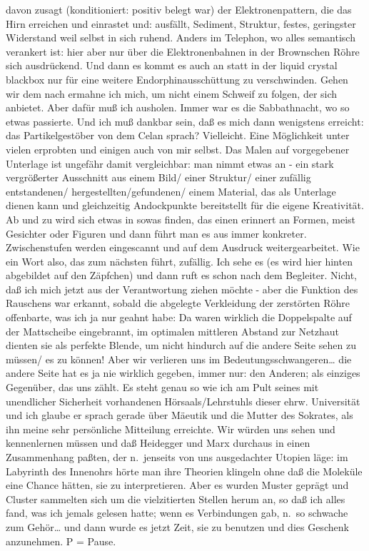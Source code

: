 \documentclass[
]{article}
\begin{document}
davon zusagt (konditioniert: positiv belegt war) der Elektronenpattern,
die das Hirn erreichen und einrastet und: ausfällt, Sediment, Struktur,
festes, geringster Widerstand weil selbst in sich ruhend. Anders im
Telephon, wo alles semantisch verankert ist: hier aber nur über die
Elektronenbahnen in der Brownschen Röhre sich ausdrückend. Und dann es
kommt es auch an statt in der liquid crystal blackbox nur für eine
weitere Endorphinausschüttung zu verschwinden. Gehen wir dem nach
ermahne ich mich, um nicht einem Schweif zu folgen, der sich anbietet.
Aber dafür muß ich ausholen. Immer war es die Sabbathnacht, wo so etwas
passierte. Und ich muß dankbar sein, daß es mich dann wenigstens
erreicht: das Partikelgestöber von dem Celan sprach? Vielleicht. Eine
Möglichkeit unter vielen erprobten und einigen auch von mir selbst. Das
Malen auf vorgegebener Unterlage ist ungefähr damit vergleichbar: man
nimmt etwas an - ein stark vergrößerter Ausschnitt aus einem Bild/ einer
Struktur/ einer zufällig entstandenen/ hergestellten/gefundenen/ einem
Material, das als Unterlage dienen kann und gleichzeitig Andockpunkte
bereitstellt für die eigene Kreativität. Ab und zu wird sich etwas in
sowas finden, das einen erinnert an Formen, meist Gesichter oder Figuren
und dann führt man es aus immer konkreter. Zwischenstufen werden
eingescannt und auf dem Ausdruck weitergearbeitet. Wie ein Wort also,
das zum nächsten führt, zufällig. Ich sehe es (es wird hier hinten
abgebildet auf den Zäpfchen) und dann ruft es schon nach dem Begleiter.
Nicht, daß ich mich jetzt aus der Verantwortung ziehen möchte - aber die
Funktion des Rauschens war erkannt, sobald die abgelegte Verkleidung der
zerstörten Röhre offenbarte, was ich ja nur geahnt habe: Da waren
wirklich die Doppelspalte auf der Mattscheibe eingebrannt, im optimalen
mittleren Abstand zur Netzhaut dienten sie als perfekte Blende, um nicht
hindurch auf die andere Seite sehen zu müssen/ es zu können! Aber wir
verlieren uns im Bedeutungsschwangeren\ldots{} die andere Seite hat es
ja nie wirklich gegeben, immer nur: den Anderen; als einziges Gegenüber,
das uns zählt. Es steht genau so wie ich am Pult seines mit unendlicher
Sicherheit vorhandenen Hörsaals/Lehrstuhls dieser ehrw. Universität und
ich glaube er sprach gerade über Mäeutik und die Mutter des Sokrates,
als ihn meine sehr persönliche Mitteilung erreichte. Wir würden uns
sehen und kennenlernen müssen und daß Heidegger und Marx durchaus in
einen Zusammenhang paßten, der n.~jenseits von uns ausgedachter Utopien
läge: im Labyrinth des Innenohrs hörte man ihre Theorien klingeln ohne
daß die Moleküle eine Chance hätten, sie zu interpretieren. Aber es
wurden Muster geprägt und Cluster sammelten sich um die vielzitierten
Stellen herum an, so daß ich alles fand, was ich jemals gelesen hatte;
wenn es Verbindungen gab, n.~so schwache zum Gehör\ldots{} und dann
wurde es jetzt Zeit, sie zu benutzen und dies Geschenk anzunehmen. P =
Pause.
\end{document}
